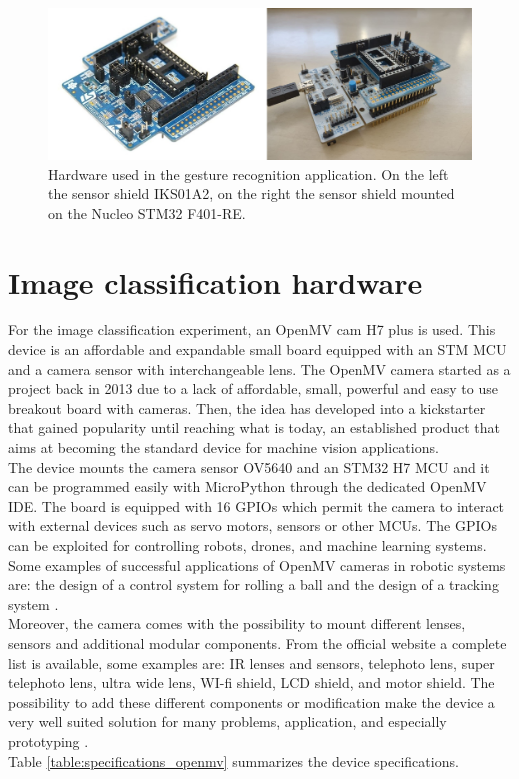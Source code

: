 \documentclass[12pt]{report}
\begin{document}
\begin{figure}[h!]
    \centering
    \includegraphics[width=120mm]{Figures/Chapter2/hardware_stm.jpg} 
    \caption{Hardware used in the gesture recognition application. On the left the sensor shield IKS01A2, on the right the sensor shield mounted on the Nucleo STM32 F401-RE.}
    \label{fig:hardware_stm}    
\end{figure}



\section{Image classification hardware}
For the image classification experiment, an OpenMV cam H7 plus \autocite{abdelkader2017openmv} \autocite{openmv_web_page} is used. This device is an affordable and expandable small board equipped with an STM MCU and a camera sensor with interchangeable lens. The OpenMV camera started as a project \autocite{openmv_project} back in 2013 due to a lack of affordable, small, powerful and easy to use breakout board with cameras. Then, the idea has developed into a kickstarter that gained popularity until reaching what is today, an established product that aims at becoming the standard device for machine vision applications. \\
The device mounts the camera sensor OV5640 and an STM32 H7 MCU and it can be programmed easily with MicroPython through the dedicated OpenMV IDE. The board is equipped with 16 GPIOs which permit the camera to interact with external devices such as servo motors, sensors or other MCUs. The GPIOs can be exploited for controlling robots, drones, and machine learning systems. Some examples of successful applications of OpenMV cameras in robotic systems are: the design of a control system for rolling a ball \autocite{zhou2019design} and the design of a tracking system \autocite{wei2020design}.\\
Moreover, the camera comes with the possibility to mount different lenses, sensors and additional modular components. From the official website a complete list is available, some examples are: IR lenses and sensors, telephoto lens, super telephoto lens, ultra wide lens, WI-fi shield, LCD shield, and motor shield.
The possibility to add these different components or modification make the device a very well suited solution for many problems, application, and especially prototyping .\\
Table \ref{table:specifications_openmv} summarizes the device specifications.\\
\end{document}
